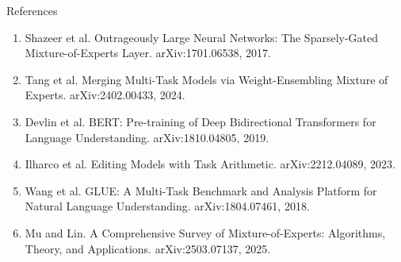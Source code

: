 
\begin{frame}{References}
  \footnotesize
  \begin{enumerate}
    \item[{[1]}] Shazeer et al. Outrageously Large Neural Networks: The Sparsely-Gated Mixture-of-Experts Layer. arXiv:1701.06538, 2017.
    \item[{[2]}] Tang et al. Merging Multi-Task Models via Weight-Ensembling Mixture of Experts. arXiv:2402.00433, 2024.
    \item[{[3]}] Devlin et al. BERT: Pre-training of Deep Bidirectional Transformers for Language Understanding. arXiv:1810.04805, 2019.
    \item[{[4]}] Ilharco et al. Editing Models with Task Arithmetic. arXiv:2212.04089, 2023.
    \item[{[5]}] Wang et al. GLUE: A Multi-Task Benchmark and Analysis Platform for Natural Language Understanding. arXiv:1804.07461, 2018.
    \item[{[6]}] Mu and Lin. A Comprehensive Survey of Mixture-of-Experts: Algorithms, Theory, and Applications. arXiv:2503.07137, 2025.
  \end{enumerate}
\end{frame}
